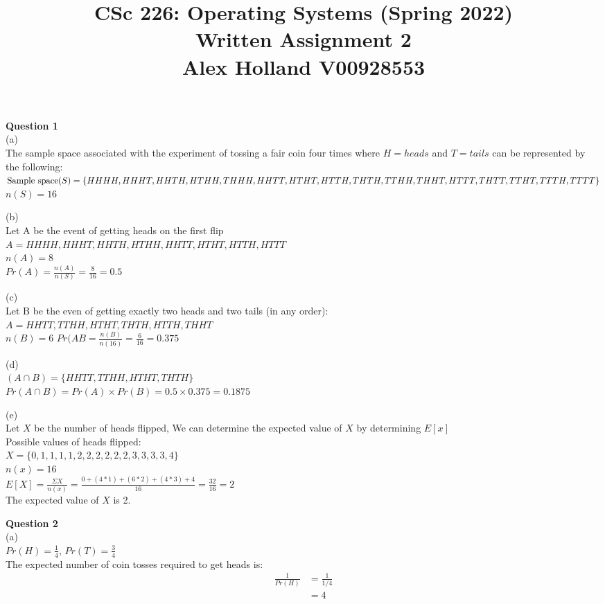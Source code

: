 \documentclass{article}
\title{%
   CSc 226: Operating Systems (Spring 2022) \\
   \large Written Assignment 2\\
    Alex Holland V00928553}
\date{}
\begin{document}
\maketitle

{\bf Question 1}\\
(a)\\
The sample space associated with the experiment of tossing a fair coin four times where $H=heads$ and $T=tails$ can be represented by the following:\\
$\text{Sample space} (S) = \{HHHH, HHHT, HHTH, HTHH, THHH, HHTT, HTHT,\\ 
HTTH ,THTH, TTHH, THHT, HTTT, THTT, TTHT, TTTH, TTTT\}$\\
$n(S) = 16$

\bigskip
(b)\\
Let A be the event of getting heads on the first flip\\
$A={HHHH, HHHT, HHTH, HTHH, HHTT, HTHT, HTTH, HTTT}$\\
$n(A) = 8$\\
$Pr(A)=\frac{n(A)}{n(S)}=\frac{8}{16}=0.5$

\bigskip
(c)\\
Let B be the even of getting exactly two heads and two tails (in any order):\\
$A={HHTT, TTHH, HTHT, THTH, HTTH, THHT}$\\
$n(B)=6$
$Pr(AB=\frac{n(B)}{n(16)}=\frac{6}{16}=0.375$

\bigskip
(d)\\
$(A \cap B) = \{HHTT, TTHH, HTHT, THTH\}$\\
$Pr(A \cap B) = Pr(A) \times Pr(B) = 0.5 \times 0.375 = 0.1875$


\bigskip
(e)\\
Let $X$ be the number of heads flipped, We can determine the expected value of $X$ by determining $E[x]$\\
Possible values of heads flipped:\\
$X=\{0,1,1,1,1,2,2,2,2,2,2,3,3,3,3,4\}$\\
$n(x) = 16$\\
$E[X] = \frac{\Sigma X}{n(x)}=\frac{0+(4*1)+(6*2)+(4*3)+4}{16}=\frac{32}{16}=2$\\
The expected value of $X$ is 2.

\bigskip
{\bf Question 2}\\
(a)\\
$Pr(H) = \frac{1}{4}$, $Pr(T) = \frac{3}{4}$\\
The expected number of coin tosses required to get heads is:
\begin{equation*} 
\begin{split}
    \frac{1}{Pr(H)} &= \frac{1}{1/4}\\
    &= 4\\
\end{split}
\end{equation*} 
\end{document}
